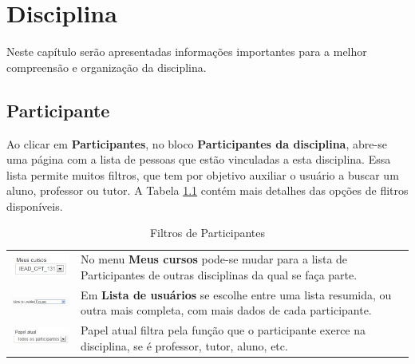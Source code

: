 \chapter{Disciplina}

Neste capítulo serão apresentadas informações importantes para a melhor compreensão e organização da disciplina.

\section{Participante}

Ao clicar em \textbf{Participantes}, no bloco \textbf{Participantes da disciplina}, abre-se uma página com a lista de pessoas que estão vinculadas a esta disciplina. Essa lista permite muitos filtros, que tem por objetivo auxiliar o usuário a buscar um aluno, professor ou tutor. 
A Tabela \ref{table:filtrosParticipantes} contém mais detalhes das opções de flitros disponíveis.

\begin{table}[htbp]
\begin{flushleft}
\begin{tabular}{p{6cm}|p{8cm}} \hline
\vspace{0.1cm} \includegraphics[width=2.2cm]{imagem/cap3/fig1.jpg} & No menu \textbf{Meus cursos} pode-se mudar para a lista de Participantes de outras disciplinas da qual se faça parte.\\ %
\vspace{0.1cm} \includegraphics[width=4cm]{imagem/cap3/fig4.jpg}&Em \textbf{Lista de usuários} se escolhe entre uma lista resumida, ou outra mais completa, com mais dados de cada participante.\\%
\includegraphics[width=3cm]{imagem/cap3/fig5.jpg}&Papel atual filtra pela função que o participante exerce na disciplina, se é professor, tutor, aluno, etc.\\\hline
\end{tabular}
\caption{Filtros de Participantes}
  \label{table:filtrosParticipantes}
\end{flushleft}
\end{table}%

